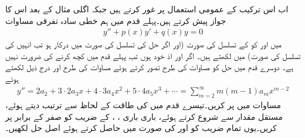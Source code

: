 اب اس ترکیب کے عمومی استعمال پر غور کرتے ہیں جبکہ اگلی مثال کے بعد اس کا جواز پیش کرتے ہیں۔پہلے قدم میں ہم خطی سادہ تفرقی مساوات
\begin{align}\label{مساوات_بیسل_طاقتی_عمومی_مساوات_الف}
y''+p(x)y'+q(x)y=0
\end{align}
میں  اور  کو  کے تسلسل کی صورت  (اور اگر حل  کی تسلسل کی صورت میں درکار ہو تب انہیں  کی تسلسل کی صورت) میں لکھتے ہیں۔ اگر  اور  اذ خود    ہوں تب پہلے قدم میں کچھ کرنے کی ضرورت نہیں ہے۔ دوسرے قدم میں حل کو مساوات  کی طرح تصور کرتے ہوئے  مساوات  کی طرح  اور درج ذیل  لکھتے ہوئے
\begin{align}\label{مساوات_بیسل_طاقتی_تسلسل_حل_پ}
y''=2a_2+3\cdot 2 a_3x+4\cdot 3 a_4x^2+5\cdot 4 a_5 x^3+\cdots=\sum_{m=2}^{\infty} m(m-1)a_mx^{m-2}
\end{align}
مساوات  میں پر کریں۔تیسرے قدم میں  کی طاقت کے لحاظ سے ترتیب دیتے ہوئے، مستقل مقدار سے شروع کرتے ہوئے، باری باری ، ،  کے  ضریب  کو صفر کے برابر پر کریں۔یوں تمام  ضریب  کو  اور  کی صورت میں حاصل کرتے ہوئے اصل حل لکھیں۔

